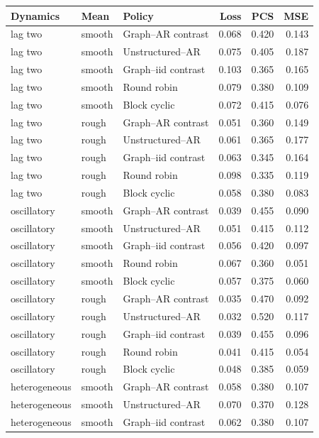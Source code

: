 \begin{table}[p]
\centering\scriptsize

\begin{tabular}{lllrrr}
\toprule
Dynamics & Mean & Policy & Loss & PCS & MSE \\
\midrule
lag two & smooth & Graph--AR contrast & 0.068 & 0.420 & 0.143 \\
lag two & smooth & Unstructured--AR & 0.075 & 0.405 & 0.187 \\
lag two & smooth & Graph--iid contrast & 0.103 & 0.365 & 0.165 \\
lag two & smooth & Round robin & 0.079 & 0.380 & 0.109 \\
lag two & smooth & Block cyclic & 0.072 & 0.415 & 0.076 \\
lag two & rough & Graph--AR contrast & 0.051 & 0.360 & 0.149 \\
lag two & rough & Unstructured--AR & 0.061 & 0.365 & 0.177 \\
lag two & rough & Graph--iid contrast & 0.063 & 0.345 & 0.164 \\
lag two & rough & Round robin & 0.098 & 0.335 & 0.119 \\
lag two & rough & Block cyclic & 0.058 & 0.380 & 0.083 \\
oscillatory & smooth & Graph--AR contrast & 0.039 & 0.455 & 0.090 \\
oscillatory & smooth & Unstructured--AR & 0.051 & 0.415 & 0.112 \\
oscillatory & smooth & Graph--iid contrast & 0.056 & 0.420 & 0.097 \\
oscillatory & smooth & Round robin & 0.067 & 0.360 & 0.051 \\
oscillatory & smooth & Block cyclic & 0.057 & 0.375 & 0.060 \\
oscillatory & rough & Graph--AR contrast & 0.035 & 0.470 & 0.092 \\
oscillatory & rough & Unstructured--AR & 0.032 & 0.520 & 0.117 \\
oscillatory & rough & Graph--iid contrast & 0.039 & 0.455 & 0.096 \\
oscillatory & rough & Round robin & 0.041 & 0.415 & 0.054 \\
oscillatory & rough & Block cyclic & 0.048 & 0.385 & 0.059 \\
heterogeneous & smooth & Graph--AR contrast & 0.058 & 0.380 & 0.107 \\
heterogeneous & smooth & Unstructured--AR & 0.070 & 0.370 & 0.128 \\
heterogeneous & smooth & Graph--iid contrast & 0.062 & 0.380 & 0.107 \\

\end{tabular}
\end{table}
